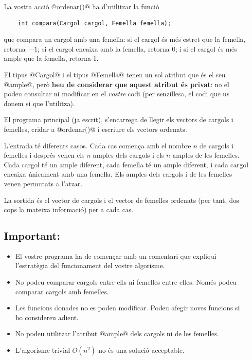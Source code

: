 \medskip

La vostra acció @ordenar()@ ha d'utilitzar la funció

\begin{lstlisting}
    int compara(Cargol cargol, Femella femella);
\end{lstlisting}

que compara un cargol amb una femella: si el cargol és més estret que la
femella, retorna~$-1$; si el cargol encaixa amb la femella, retorna 0; i  si el
cargol és més ample que la femella, retorna 1.

\medskip

El tipus @Cargol@ i el tipus @Femella@ tenen un sol atribut que és el seu @ample@, però
\textbf{heu de consi\-derar que aquest atribut és privat}: no el podeu consultar
ni modificar en el \emph{vostre} codi (per senzillesa, el codi que us donem sí que l'utilitza).

\medskip

El programa principal (ja escrit), s'encarrega de llegir els vectors de cargols i femelles,
cridar a @ordenar()@ i escriure els vectors ordenats.

\Input

L'entrada té diferents casos.
Cada cas comença amb el nombre $n$ de cargols i femelles i després venen els
$n$ amples dels cargols i els $n$ amples de les femelles. Cada cargol té un ample diferent, cada
femella té un ample diferent, i cada cargol encaixa únicament amb una femella.
Els amples dels cargols i de les femelles venen permutats a l'atzar.

\Output

La sortida és el vector de cargols i el vector de femelles ordenats (per tant, dos cops
la mateixa informació) per a cada cas.


\subsection*{Important:}

\begin{itemize}

\item El vostre programa ha de començar amb un comentari que expliqui l'estratègia
del funcionament del vostre algorisme.

\item No podeu comparar cargols entre ells ni femelles entre elles.
Només podeu comparar cargols amb femelles.

\item Les funcions donades no es poden modificar. Podeu afegir noves funcions si ho considereu
adient.

\item No podeu utilitzar l'atribut @ample@ dels cargols ni de les femelles.

\item L'algorisme trivial $O(n^2)$ no és una solució acceptable.

\end{itemize}


\Sample
